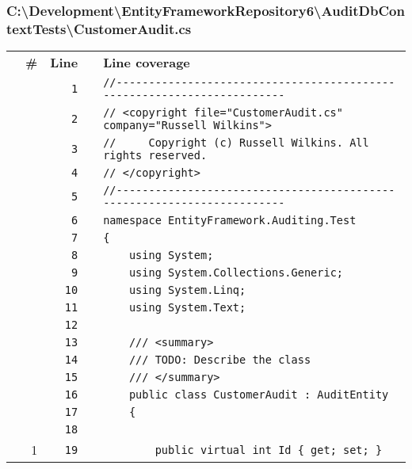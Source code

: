 \documentclass[a4paper,10pt]{article}
\begin{document}
\subsubsection{C:\textbackslash Development\textbackslash EntityFrameworkRepository6\textbackslash AuditDbContextTests\textbackslash CustomerAudit.cs}
\begin{longtable}[l]{lrrll}
\textbf{} & \textbf{\#} & \textbf{Line} & \textbf{} & \textbf{Line coverage}\\
\cellcolor{gray} &  & \verb~1~ & & \verb~//-----------------------------------------------------------------------~\\
\cellcolor{gray} &  & \verb~2~ & & \verb~// <copyright file="CustomerAudit.cs" company="Russell Wilkins">~\\
\cellcolor{gray} &  & \verb~3~ & & \verb~//     Copyright (c) Russell Wilkins. All rights reserved.~\\
\cellcolor{gray} &  & \verb~4~ & & \verb~// </copyright>~\\
\cellcolor{gray} &  & \verb~5~ & & \verb~//-----------------------------------------------------------------------~\\
\cellcolor{gray} &  & \verb~6~ & & \verb~namespace EntityFramework.Auditing.Test~\\
\cellcolor{gray} &  & \verb~7~ & & \verb~{~\\
\cellcolor{gray} &  & \verb~8~ & & \verb~    using System;~\\
\cellcolor{gray} &  & \verb~9~ & & \verb~    using System.Collections.Generic;~\\
\cellcolor{gray} &  & \verb~10~ & & \verb~    using System.Linq;~\\
\cellcolor{gray} &  & \verb~11~ & & \verb~    using System.Text;~\\
\cellcolor{gray} &  & \verb~12~ & & \verb~~\\
\cellcolor{gray} &  & \verb~13~ & & \verb~    /// <summary>~\\
\cellcolor{gray} &  & \verb~14~ & & \verb~    /// TODO: Describe the class~\\
\cellcolor{gray} &  & \verb~15~ & & \verb~    /// </summary>~\\
\cellcolor{gray} &  & \verb~16~ & & \verb~    public class CustomerAudit : AuditEntity~\\
\cellcolor{gray} &  & \verb~17~ & & \verb~    {~\\
\cellcolor{gray} &  & \verb~18~ & & \verb~~\\
\cellcolor{green} & 1 & \verb~19~ & & \verb~        public virtual int Id { get; set; }~\\

\end{longtable}
\end{document}
